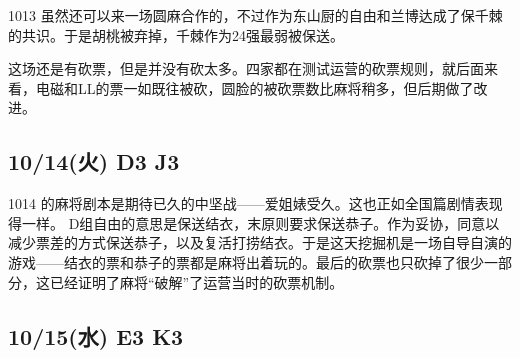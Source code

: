1013 虽然还可以来一场圆麻合作的，不过作为东山厨的自由和兰博达成了保千棘的共识。于是胡桃被弃掉，千棘作为24强最弱被保送。

这场还是有砍票，但是并没有砍太多。四家都在测试运营的砍票规则，就后面来看，电磁和LL的票一如既往被砍，圆脸的被砍票数比麻将稍多，但后期做了改进。

\subsection{10/14(火) D3 J3}


1014 的麻将剧本是期待已久的中坚战——爱姐婊受久。这也正如全国篇剧情表现得一样。
D组自由的意思是保送结衣，末原则要求保送恭子。作为妥协，同意以减少票差的方式保送恭子，以及复活打捞结衣。于是这天挖掘机是一场自导自演的游戏——结衣的票和恭子的票都是麻将出着玩的。最后的砍票也只砍掉了很少一部分，这已经证明了麻将“破解”了运营当时的砍票机制。

\subsection{10/15(水) E3 K3}

